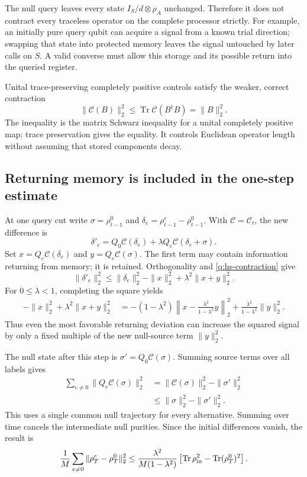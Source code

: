\documentclass[11pt,a4paper]{article}
\numberwithin{equation}{section}
\theoremstyle{definition}
\theoremstyle{remark}
\DeclareMathOperator{\Tr}{Tr}
\begin{document}
The null query leaves every state $I_S/d\otimes\rho_A$ unchanged. Therefore
it does not contract every traceless operator on the complete processor
strictly. For example, an initially pure query qubit can acquire a signal from
a known trial direction; swapping that state into protected memory leaves the
signal untouched by later calls on $S$. A valid converse must allow this
storage and its possible return into the queried register.

Unital trace-preserving completely positive controls satisfy the weaker,
correct contraction
\begin{equation}
 \|\mathcal C(B)\|_2^2
 \leq\Tr\mathcal C(B^\dagger B)=\|B\|_2^2.
 \label{q:hs-contraction}
\end{equation}
The inequality is the matrix Schwarz inequality for a unital completely
positive map; trace preservation gives the equality. It controls Euclidean
operator length without assuming that stored components decay.

\subsection{Returning memory is included in the one-step estimate}

At one query cut write $\sigma=\rho_{t-1}^0$ and
$\delta_e=\rho_{t-1}^e-\rho_{t-1}^0$. With $\mathcal C=\mathcal C_t$,
the new difference is
\[
 \delta'_e=Q_0\mathcal C(\delta_e)
             +\lambda Q_e\mathcal C(\delta_e+\sigma).
\]
Set $x=Q_e\mathcal C(\delta_e)$ and $y=Q_e\mathcal C(\sigma)$.
The first term may contain information returning from memory; it is retained.
Orthogonality and \eqref{q:hs-contraction} give
\[
 \|\delta'_e\|_2^2
 \leq\|\delta_e\|_2^2-\|x\|_2^2+\lambda^2\|x+y\|_2^2 .
\]
For $0\leq\lambda<1$, completing the square yields
\begin{align}
 -\|x\|_2^2+\lambda^2\|x+y\|_2^2
  &=
 -(1-\lambda^2)
 \left\|x-\frac{\lambda^2}{1-\lambda^2}y\right\|_2^2
 +\frac{\lambda^2}{1-\lambda^2}\|y\|_2^2 .
 \label{q:completed-square}
\end{align}
Thus even the most favorable returning deviation can increase the squared
signal by only a fixed multiple of the new null-source term $\|y\|_2^2$.

The null state after this step is $\sigma'=Q_0\mathcal C(\sigma)$.
Summing source terms over all labels gives
\begin{align}
 \sum_{e\ne0}\|Q_e\mathcal C(\sigma)\|_2^2
 &=\|\mathcal C(\sigma)\|_2^2-\|\sigma'\|_2^2\nonumber\\
 &\leq\|\sigma\|_2^2-\|\sigma'\|_2^2 .
 \label{q:null-purity-loss}
\end{align}
This uses a single common null trajectory for every alternative. Summing over
time cancels the intermediate null purities. Since the initial differences
vanish, the result is
\begin{equation}
 \frac1M\sum_{e\ne0}\|\rho_T^e-\rho_T^0\|_2^2
 \leq\frac{\lambda^2}{M(1-\lambda^2)}
 \left[\Tr\rho_{\rm in}^2-\Tr(\rho_T^0)^2\right].
 \label{q:individual-hs}
\end{equation}
\end{document}
